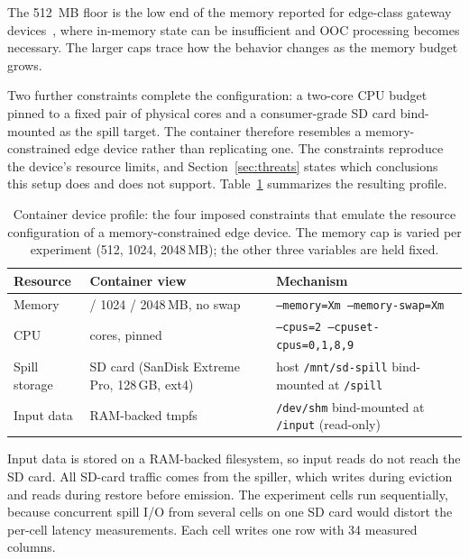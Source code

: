 The 512\, MB floor is the low end of the memory reported for edge-class gateway devices~\cite{ojo2019}, where in-memory state can be insufficient and \ac{OOC} processing becomes necessary.
The larger caps trace how the behavior changes as the memory budget grows.

Two further constraints complete the configuration: a two-core \ac{CPU} budget pinned to a fixed pair of physical cores and a consumer-grade \ac{SD} card bind-mounted as the spill target.
The container therefore resembles a memory-constrained edge device rather than replicating one.
The constraints reproduce the device's resource limits, and Section~\ref{sec:threats} states which conclusions this setup does and does not support.
Table~\ref{tab:edge-profile} summarizes the resulting profile.

\begin{table}[ht]
\centering
\small
\begin{tabular}{|>{\raggedright\arraybackslash}p{2.2cm}|>{\raggedright\arraybackslash}p{4.7cm}|>{\raggedright\arraybackslash}p{6.0cm}|}
\hline
\textbf{Resource} & \textbf{Container view} & \textbf{Mechanism} \\
\hline
Memory & 512 / 1024 / 2048\,MB, no swap & \texttt{--memory=Xm --memory-swap=Xm} \\
\hline
CPU & 2 cores, pinned & \texttt{--cpus=2 --cpuset-cpus=0,1,8,9} \\
\hline
Spill storage & SD card (SanDisk Extreme Pro, 128\,GB, ext4) & host \texttt{/mnt/sd-spill} bind-mounted at \texttt{/spill} \\
\hline
Input data & RAM-backed tmpfs & \texttt{/dev/shm} bind-mounted at \texttt{/input} (read-only) \\
\hline
\end{tabular}
\caption[Container device profile]{Container device profile: the four imposed constraints that emulate the
resource configuration of a memory-constrained edge device.
The memory cap is varied per experiment (512, 1024, 2048\,MB); the other three
variables are held fixed.}
\label{tab:edge-profile}
\end{table}

Input data is stored on a RAM-backed filesystem, so input reads do not reach the SD card.
All SD-card traffic comes from the spiller, which writes during eviction and reads during restore before emission.
The experiment cells run sequentially, because concurrent spill I/O from several cells on one \ac{SD} card would distort the per-cell latency measurements.
Each cell writes one row with 34 measured columns.

